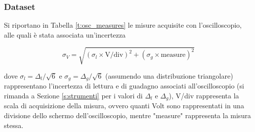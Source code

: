 \documentclass[a4paper,11pt]{article} %
\begin{document}

\subsubsection{Dataset}
Si riportano in Tabella \ref{t:osc_measures} le misure acquisite con l'oscilloscopio, alle quali è stata associata un'incertezza

\begin{equation}\label{e:osc}
	\sigma_{V} = \sqrt{ (\sigma_{l}\times\text{V/div})^2 + (\sigma_{g}\times\text{measure})^2 }
\end{equation}

\noindent dove $\sigma_{l}=\Delta_{l}/\sqrt{6}$ e $\sigma_{g}=\Delta_{g}/\sqrt{6}$ (assumendo una distribuzione
triangolare) rappresentano l'incertezza di lettura e di guadagno associati all'oscilloscopio (si rimanda a Sezione
\ref{s:strumenti} per i valori di $\Delta_{l}$ e $\Delta_{g}$), V/div rappresenta la scala di acquisizione della misura,
ovvero quanti Volt sono rappresentati in una divisione dello schermo dell'oscilloscopio, mentre "measure" rappresenta la
misura stessa.
\end{document}

